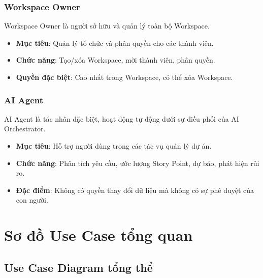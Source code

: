 \documentclass[12pt,a4paper]{report}
\begin{document}
\subsubsection{Workspace Owner}

Workspace Owner là người sở hữu và quản lý toàn bộ Workspace.

\begin{itemize}
\item \textbf{Mục tiêu}: Quản lý tổ chức và phân quyền cho các thành viên.
\item \textbf{Chức năng}: Tạo/xóa Workspace, mời thành viên, phân quyền.
\item \textbf{Quyền đặc biệt}: Cao nhất trong Workspace, có thể xóa Workspace.
\end{itemize}

\subsubsection{AI Agent}

AI Agent là tác nhân đặc biệt, hoạt động tự động dưới sự điều phối của AI Orchestrator.

\begin{itemize}
\item \textbf{Mục tiêu}: Hỗ trợ người dùng trong các tác vụ quản lý dự án.
\item \textbf{Chức năng}: Phân tích yêu cầu, ước lượng Story Point, dự báo, phát hiện rủi ro.
\item \textbf{Đặc điểm}: Không có quyền thay đổi dữ liệu mà không có sự phê duyệt của con người.
\end{itemize}

\section{Sơ đồ Use Case tổng quan}

\subsection{Use Case Diagram tổng thể}
\end{document}
